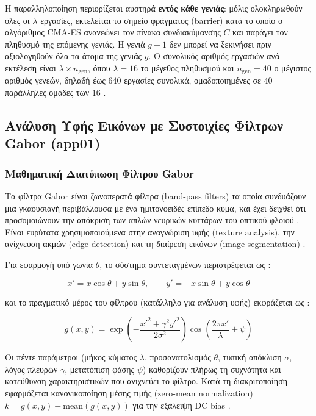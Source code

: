 Η παραλληλοποίηση περιορίζεται αυστηρά \textbf{εντός κάθε γενιάς}: μόλις ολοκληρωθούν όλες οι $\lambda$ εργασίες, εκτελείται το σημείο φράγματος (barrier) κατά το οποίο ο αλγόριθμος CMA-ES ανανεώνει τον πίνακα συνδιακύμανσης $C$ και παράγει τον πληθυσμό της επόμενης γενιάς. Η γενιά $g+1$ δεν μπορεί να ξεκινήσει πριν αξιολογηθούν όλα τα άτομα της γενιάς $g$. Ο συνολικός αριθμός εργασιών ανά εκτέλεση είναι $\lambda \times n_\mathrm{gen}$, όπου $\lambda=16$ το μέγεθος πληθυσμού και $n_\mathrm{gen}=40$ ο μέγιστος αριθμός γενεών, δηλαδή έως $640$ εργασίες συνολικά, ομαδοποιημένες σε $40$ παράλληλες ομάδες των $16$ \cite{appcode}.

\subsection{Ανάλυση Υφής Εικόνων με Συστοιχίες Φίλτρων Gabor (app01)}

\subsubsection{Μαθηματική Διατύπωση Φίλτρου Gabor}

Τα φίλτρα Gabor είναι ζωνοπερατά φίλτρα (band-pass filters) τα οποία συνδυάζουν μια γκαουσιανή περιβάλλουσα με ένα ημιτονοειδές επίπεδο κύμα, και έχει δειχθεί ότι προσομοιώνουν την απόκριση των απλών νευρικών κυττάρων του οπτικού φλοιού . Είναι ευρύτατα χρησιμοποιούμενα στην αναγνώριση υφής (texture analysis), την ανίχνευση ακμών (edge detection) και τη διαίρεση εικόνων (image segmentation) \cite{WikiGabor,GaborMDPI}.

Για εφαρμογή υπό γωνία $\theta$, το σύστημα συντεταγμένων περιστρέφεται ως \cite{WikiGabor,Baeldung}:

\begin{equation}
  x' = x\cos\theta + y\sin\theta, \qquad
  y' = -x\sin\theta + y\cos\theta
\end{equation}

και το πραγματικό μέρος του φίλτρου (κατάλληλο για ανάλυση υφής)
εκφράζεται ως \cite{Baeldung}:

\begin{equation}
  g(x,y) = \exp\!\left(-\frac{x'^2 + \gamma^2 y'^2}{2\sigma^2}\right)
            \cos\!\left(\frac{2\pi x'}{\lambda} + \psi\right)
\end{equation}

Οι πέντε παράμετροι (μήκος κύματος $\lambda$, προσανατολισμός $\theta$, τυπική απόκλιση $\sigma$, λόγος πλευρών $\gamma$, μετατόπιση φάσης $\psi$) καθορίζουν πλήρως τη συχνότητα και κατεύθυνση χαρακτηριστικών που ανιχνεύει το φίλτρο. Κατά τη διακριτοποίηση εφαρμόζεται κανονικοποίηση μέσης τιμής (zero-mean normalization) $k = g(x,y) - \mathrm{mean}(g(x,y))$ για την εξάλειψη DC bias \cite{appcode,WikiGabor,GaborMDPI}.

